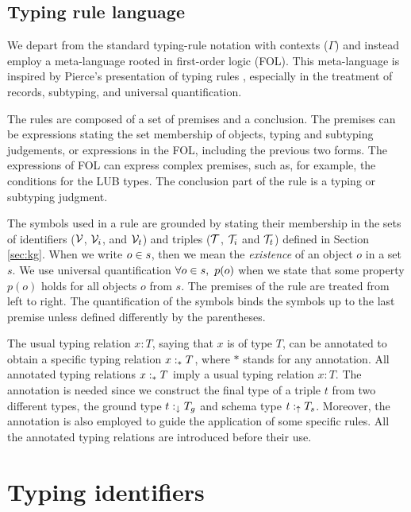 \documentclass[runningheads]{llncs}
\newcommand{\darr}{\downarrow}
\newcommand{\uarr}{\uparrow}
\newcommand{\V}{{\cal V}}
\newcommand{\T}{{\cal T}}
\begin{document}
\subsection{Typing rule language}

We depart from the standard typing-rule notation with contexts
($\Gamma$) \cite{Pierce2002,Hindley1997} and instead employ a
meta-language rooted in first-order logic (FOL). This meta-language is
inspired by Pierce’s presentation of typing rules \cite{Pierce2002},
especially in the treatment of records, subtyping, and universal
quantification.

The rules are composed of a set of premises and a conclusion. The
premises can be expressions stating the set membership of objects,
typing and subtyping judgements, or expressions in the FOL, including
the previous two forms. The expressions of FOL can express complex
premises, such as, for example, the conditions for the LUB types. The
conclusion part of the rule is a typing or subtyping judgment.

The symbols used in a rule are grounded by stating their membership in
the sets of identifiers ($\V$, $\V_i$, and $\V_t$) and triples ($\T$,
$\T_i$ and $\T_t$) defined in Section \ref{sec:kg}. When we write
$o\in\/s$, then we mean the \emph{existence} of an object $o$ in a set
$s$. We use universal quantification $\forall\/o\in\/s,\ p(o)$ when we
state that some property $p(o)$ holds for all objects $o$ from
$s$. The premises of the rule are treated from left to right. The
quantification of the symbols binds the symbols up to the last premise
unless defined differently by the parentheses.

The usual typing relation $x:T$, saying that $x$ is of type $T$, can
be annotated to obtain a specific typing relation $x:_*\/T$, where $*$
stands for any annotation. All annotated typing relations $x:_*\/T$
imply a usual typing relation $x:T$. The annotation is needed since we
construct the final type of a triple $t$ from two different types, the
ground type $t:_\darr\/T_g$ and schema type $t:_\uarr\/T_s$. Moreover,
the annotation is also employed to guide the application of
some specific rules. All the annotated typing relations are introduced
before their use.









\section{Typing identifiers\label{sec:typ-idents}}
\end{document}
